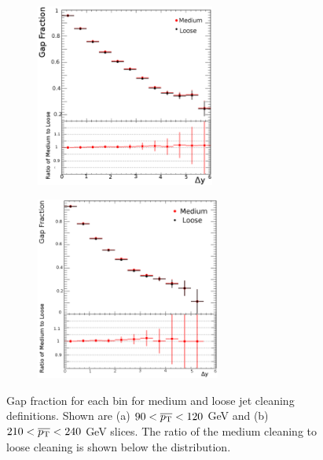 \begin{figure}
\centering
        \begin{subfigure}[b]{0.5\textwidth}
                \centering
                \includegraphics[height=6cm,width=\textwidth]{figures/GBJ1/JetCleaning/RatioGF_selA_Ave_pT_90_120.eps}
        \end{subfigure}%
        \begin{subfigure}[b]{0.5\textwidth}
                \centering
                \includegraphics[height=6cm,width=\textwidth]{figures/GBJ1/JetCleaning/RatioGF_selA_Ave_pT_210_240.eps}
        \end{subfigure}%
\caption[Effect of jet cleaning on the gap fraction versus \ptb{}]{
Gap fraction for each \dy{} bin for medium and loose jet cleaning definitions. 
Shown are (a) $90<\mbox{$\overline{p_{\rm T}}$}{}<120$ GeV and (b) $210<\mbox{$\overline{p_{\rm T}}$}{}<240$ GeV slices.
The ratio of the medium cleaning to loose cleaning is shown below the distribution.
\label{JetCleanGF_dy}}
\end{figure}


